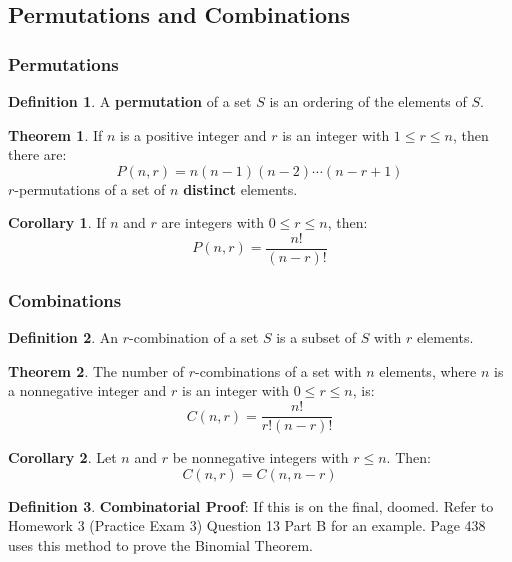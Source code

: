 \documentclass[article, 11pt]{article}
\theoremstyle{definition}
\newtheorem{theorem}{Theorem}[subsubsection]
\newtheorem{definition}{Definition}[subsubsection]
\newtheorem{corollary}{Corollary}[subsubsection]
\begin{document}
    \subsection{Permutations and Combinations}
    \subsubsection{Permutations}
    \begin{definition}
        A \textbf{permutation} of a set $S$ is an ordering of the elements of $S$.
    \end{definition}
    \begin{theorem}
        If $n$ is a positive integer and $r$ is an integer with $1 \leq r \leq n$, then there are:
        \begin{equation*}
            P(n,r) = n(n-1)(n-2)\cdots(n-r+1)
        \end{equation*}
        $r$-permutations of a set of $n$ \textbf{distinct} elements.
    \end{theorem}
    \begin{corollary}
        If $n$ and $r$ are integers with $0 \leq r \leq n$, then: 
        \begin{equation*}
            P(n,r) = \frac{n!}{(n-r)!}
        \end{equation*}
    \end{corollary}
    \subsubsection{Combinations}
    \begin{definition}
        An $r$-combination of a set $S$ is a subset of $S$ with $r$ elements.
    \end{definition}
    \begin{theorem}
        The number of $r$-combinations of a set with $n$ elements, where $n$ is a nonnegative integer and $r$ is an integer with $0 \leq r \leq n$, is:
        \begin{equation*}
            C(n,r) = \frac{n!}{r!(n-r)!}
        \end{equation*}
    \end{theorem}
    \begin{corollary}
        Let $n$ and $r$ be nonnegative integers with $r \leq n$. Then:
        \begin{equation*}
            C(n,r) = C(n, n-r)
        \end{equation*}
    \end{corollary}
    \begin{definition}
        \textbf{Combinatorial Proof}: If this is on the final, doomed. Refer to Homework 3 (Practice Exam 3) Question 13 Part B for an example. Page 438 uses this method to prove the Binomial Theorem.
    \end{definition}
\end{document}

